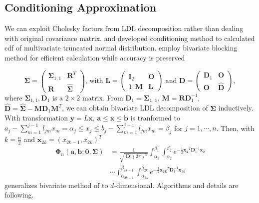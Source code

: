 \subsection{Conditioning Approximation}

We can exploit Cholesky factors from LDL decomposition rather than dealing with original covariance matrix. \citet{mendell1974multifactorial} and \citet{kamakura1989estimation} developed conditioning method to calculated cdf of multivariate truncated normal distribution. \citet{trinh2015bivariate} employ bivariate blocking method for efficient calculation while accuracy is preserved

$$\boldsymbol{\Sigma} = \begin{pmatrix}
\boldsymbol{\Sigma}_{1,1} & \mathbf{R}^T\\
\mathbf{R} & \hat{\boldsymbol{\Sigma}}
\end{pmatrix}\text{, with } \mathbf{L}=\begin{pmatrix}
\mathbf{I}_{2} & \mathbf{O}\\1:
\mathbf{M} & \mathbf{L}
\end{pmatrix}\text{ and } \mathbf{D}=\begin{pmatrix}
\mathbf{D}_{1} & \mathbf{O}\\
\mathbf{O} & \mathbf{\hat{D}}
\end{pmatrix},$$
where $\boldsymbol{\Sigma}_{1,1}, \mathbf{D}_{1}$ is a $2\times2$ matrix. From $\mathbf{D}_1=\boldsymbol{\Sigma_{1,1}}$, $\mathbf{M}=\mathbf{R}\mathbf{D}_1^{-1}$, $\mathbf{\hat{D}}=\hat{\boldsymbol{\Sigma}}-\mathbf{M}\mathbf{D}_1\mathbf{M}^T$, we can obtain bivariate LDL decomposition of $\boldsymbol{\Sigma}$ inductively.\\
With transformation $\mathbf{y}=L\mathbf{x}$, $\mathbf{a}\leq\mathbf{x}\leq\mathbf{b}$ is tranformed to $a_j-\sum_{m=1}^{j-1}l_{jm}x_m=\alpha_j\leq x_j\leq b_j-\sum_{m=1}^{j-1}l_{jm}x_m=\beta_j$ for $j=1,\cdots,n$. Then, with $k=\frac{n}{2}$ and $\mathbf{x}_{2k}=(x_{2k-1},x_{2k})^T$
\begin{align}\label{eqn:phi_cond-biv}
	\boldsymbol{\Phi}_n(\mathbf{a},\mathbf{b};\mathbf{0},\boldsymbol{\Sigma})
	&= \frac{1}{\sqrt{\lvert\mathbf{D}\rvert(2\pi)^n}}\int_{\alpha_1}^{\beta_1}\int_{\alpha_2}^{\beta_2}e^{-\frac{1}{2}\mathbf{x_2}^T\mathbf{D}_1^{-1}\mathbf{x}_2}\nonumber\\
	&\cdots \int_{\alpha_{2k-1}}^{\beta_{2k-1}}\int_{\alpha_{2k}}^{\beta_{2k}}e^{-\frac{1}{2}\mathbf{x_{2k}}^T\mathbf{D}_1^{-1}\mathbf{x}_{2k}}
\end{align}
\citet{cao2019hierarchical} generalizes bivariate method of \citet{trinh2015bivariate} to $d$-dimensional. Algorithms and details are following.
